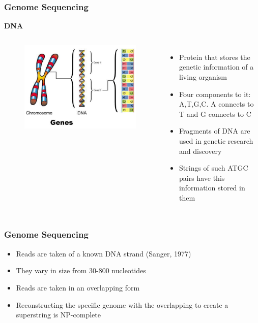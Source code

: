 \documentclass{beamer}
\begin{document}

\begin{frame}
\frametitle{Genome Sequencing}
\textbf{DNA}
\begin{columns}[c]


\begin{figure}[h]
\includegraphics[scale = 0.35]{dna.jpg}
\end{figure}



\begin{itemize}
\item Protein that stores the genetic information of a living organism
\pause
\item Four components to it: A,T,G,C. A connects to T and G connects to C
\pause
\item Fragments of DNA are used in genetic research and discovery
\item Strings of such {\color{red}ATGC} pairs have this information stored in them	
\end{itemize}


\end{columns}
\end{frame}


\begin{frame}
\frametitle{Genome Sequencing}
\begin{itemize}
\item Reads are taken of a known DNA strand (Sanger, 1977)
\item They vary in size from 30-800 nucleotides
\item Reads are taken in an overlapping form
\item Reconstructing the specific genome with the overlapping to create a superstring is NP-complete
\end{itemize}
\end{frame}
\end{document}

